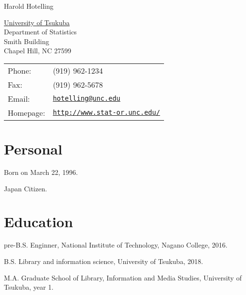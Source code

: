 \documentclass[letterpaper]{article}
\def\name{Harold Hotelling}
\renewenvironment{itemize}{
  \begin{list}{}{
    \setlength{\leftmargin}{1.5em}
  }
}{
  \end{list}
}
\begin{document}
{\huge \name}


\vspace{0.25in}

\begin{minipage}{0.45\linewidth}
  \href{http://www.unc.edu/}{University of Tsukuba} \\
  Department of Statistics \\
  Smith Building \\
  Chapel Hill, NC 27599
\end{minipage}
\begin{minipage}{0.45\linewidth}
  \begin{tabular}{ll}
    Phone: & (919) 962-1234 \\
    Fax: &  (919) 962-5678 \\
    Email: & \href{mailto:hotelling@unc.edu}{\tt hotelling@unc.edu} \\
    Homepage: & \href{http://www.stat-or.unc.edu/}{\tt http://www.stat-or.unc.edu/} \\
  \end{tabular}
\end{minipage}


\section*{Personal}

\begin{itemize}
\item Born on March 22, 1996.
\item Japan Citizen.
\end{itemize}


\section*{Education}

\begin{itemize}
  \item pre-B.S. Enginner, National Institute of Technology, Nagano College, 2016.

  \item B.S. Library and information science, University of Tsukuba, 2018.

  \item M.A. Graduate School of Library, Information and Media Studies, University of Tsukuba, year 1.
\end{itemize}
\end{document}
